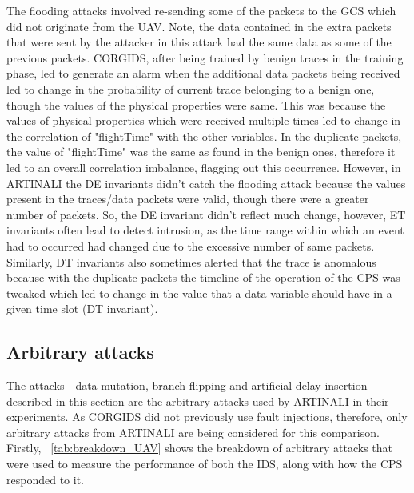 The flooding attacks involved re-sending some of the packets to the GCS which did not originate from the UAV. Note, the data contained in the extra packets that were sent by the attacker in this attack had the same data as some of the previous packets. CORGIDS, after being trained by benign traces in the training phase, led to generate an alarm when the additional data packets being received led to change in the probability of current trace belonging to a benign one, though the values of the physical properties were same. This was because the values of physical properties which were received multiple times led to change in the correlation of "flightTime" with the other variables. In the duplicate packets, the value of "flightTime" was the same as found in the benign ones, therefore it led to an overall correlation imbalance, flagging out this occurrence. However, in ARTINALI the D\textbar E invariants didn't catch the flooding attack because the values present in the traces/data packets were valid, though there were a greater number of packets. So, the D\textbar E invariant didn't reflect much change, however, E\textbar T invariants often lead to detect intrusion, as the time range within which an event had to occurred had changed due to the excessive number of same packets. Similarly, D\textbar T invariants also sometimes alerted that the trace is anomalous because with the duplicate packets the timeline of the operation of the CPS was tweaked which led to change in the value that a data variable should have in a given time slot (D\textbar T invariant).

\subsection{Arbitrary attacks}
The attacks - data mutation, branch flipping and artificial delay insertion - described in this section are the arbitrary attacks used by ARTINALI in their experiments. As CORGIDS did not previously use fault injections, therefore, only arbitrary attacks from ARTINALI are being considered for this comparison.
Firstly, ~\autoref{tab:breakdown_UAV} shows the breakdown of arbitrary attacks that were used to measure the performance of both the IDS, along with how the CPS responded to it.

\begin{table}
\centering
  \caption{Breakdown of arbitrary attacks for UAV platform}
  \label{tab:breakdown_UAV}
\end{table}

